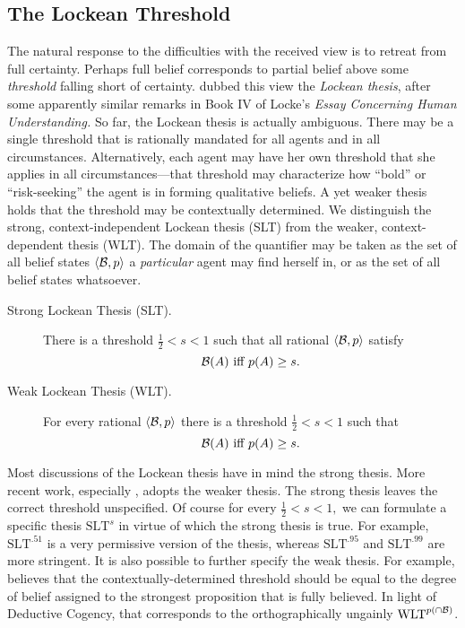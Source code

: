 \subsection{The Lockean Threshold}
\label{lockeanthreshold}
The natural response to the difficulties with the received view is to retreat
from full certainty. Perhaps full belief corresponds to partial belief above
some {\em threshold} falling short of certainty. \citet{foley1993working} dubbed
this view the {\em Lockean thesis}, after some apparently similar remarks in
Book IV of Locke's {\em Essay Concerning Human Understanding.} So far, the
Lockean thesis is actually ambiguous. There may be a single threshold that is
rationally mandated for all agents and in all circumstances. Alternatively, each
agent may have her own threshold that she applies in all circumstances---that
threshold may characterize how ``bold'' or ``risk-seeking'' the agent is in
forming qualitative beliefs. A yet weaker thesis holds that the threshold may be
contextually determined.  We  distinguish the strong, context-independent
Lockean thesis (SLT) from the weaker, context-dependent thesis (WLT). The domain
of the quantifier may be taken as the set of all belief states $\langle \mathcal{B},p
\rangle$ a {\em particular} agent may find herself in, or as the set of all
belief states whatsoever.
\begin{description}
\item[Strong Lockean Thesis (SLT).] There is a threshold $\frac{1}{2}<s<1$ such
that all rational  $\langle \mathcal{B}, p \rangle$ satisfy $$\mathcal{B}(A) \text{ iff } p(A)
\geq s.$$
\item[Weak Lockean Thesis (WLT).] For every rational $\langle \mathcal{B}, p \rangle$
there is a threshold $\frac{1}{2}< s < 1$ such that $$\mathcal{B}(A) \text{ iff } p(A)
\geq s.$$ 
\end{description}
Most discussions of the Lockean thesis have in mind the strong thesis. More
recent work, especially \citet{leitgeb2017stability}, adopts the weaker thesis.
The strong thesis leaves the correct threshold unspecified. Of course for every
$\frac{1}{2}< s<1,$ we can formulate a specific thesis $\text{SLT}^s$ in virtue
of which the strong thesis is true. For example, $\text{SLT}^{.51}$ is a very
permissive version of the thesis, whereas $\text{SLT}^{.95}$ and
$\text{SLT}^{.99}$ are more stringent. It is also possible to further specify
the weak thesis. For example, \citet{leitgeb2017stability} believes that the
contextually-determined threshold should be equal to the degree of belief
assigned to the strongest proposition that is fully believed. In light of
Deductive Cogency, that corresponds to the orthographically ungainly
$\text{WLT}^{p(\cap \mathcal{B})}$.    

